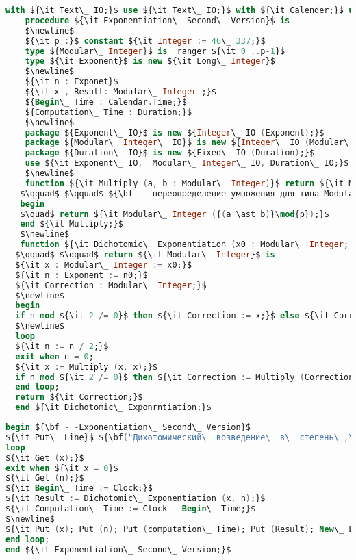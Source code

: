 \begin{lstlisting}[mathescape=true, language=Ada, basicstyle=\small, frame=lrt]
    with ${\it Text\_ IO;}$ use ${\it Text\_ IO;}$ with ${\it Calender;}$ use ${\it Calender;}$
    procedure ${\it Exponentiation\_ Second\_ Version}$ is
    $\newline$
    ${\it p :}$ constant ${\it Integer := 46\_ 337;}$
    type ${Modular\_ Integer}$ is  ranger ${\it 0 ..p-1}$ 
    type ${\it Exponent}$ is new ${\it Long\_ Integer}$
    $\newline$
    ${\it n : Exponet}$
    ${\it x , Result: Modular\_ Integer ;}$
    ${Begin\_ Time : Calendar.Time;}$
    ${Computation\_ Time : Duration;}$
    $\newline$
    package ${Exponent\_ IO}$ is new ${Integer\_ IO (Exponent);}$
    package ${Modular\_ Integer\_ IO}$ is new ${Integer\_ IO (Modular\_ Integer);}$
    package ${Duration\_ IO}$ is new ${Fixed\_ IO (Duration);}$
    use ${\it Exponent\_ IO,  Modular\_ Integer\_ IO, Duration\_ IO;}$
    $\newline$
    function ${\it Multiply (a, b : Modular\_ Integer)}$ return ${\it Modular\_ Integer}$ is
   $\qquad$ $\qquad$ ${\bf - -переопределение умножения для типа Modular\_ Integer}$
   begin
   $\quad$ return ${\it Modular\_ Integer ({(a \ast b)}\mod{p});}$
   end ${\it Multiply;}$
   $\newline$
   function ${\it Dichotomic\_ Exponentiation (x0 : Modular\_ Integer; n0 : Exponent)}$ 
  $\qquad$ $\qquad$ return ${\it Modular\_ Integer}$ is
  ${\it x : Modular\_ Integer := x0;}$
  ${\it n : Exponent := n0;}$
  ${\it Correction : Modular\_ Integer;}$
  $\newline$
  begin
  if n mod ${\it 2 /= 0}$ then ${\it Correction := x;}$ else ${\it Correction := 1;}$ end if;
  $\newline$
  loop
  ${\it n := n / 2;}$
  exit when n = 0;
  ${\it x := Multiply (x, x);}$
  if n mod ${\it 2 /= 0}$ then ${\it Correction := Multiply (Correction, x);}$ end if;
  end loop;
  return ${\it Correction;}$
  end ${\it Dichotomic\_ Exponrntiation;}$
   \end{lstlisting}
\newpage
\begin{lstlisting}[mathescape=true, language=Ada, basicstyle=\small, frame=lrb]
begin ${\bf - -Exponentiation\_ Second\_ Version}$
${\it Put\_ Line}$ ${\bf("Дихотомический\_ возведение\_ в\_ степень\_,\_ вторая\_ версия");}$
loop
${\it Get (x);}$
exit when ${\it x = 0}$
${\it Get (n);}$
${\it Begin\_ Time := Clock;}$
${\it Result := Dichotomic\_ Exponentiation (x, n);}$
${\it Computation\_ Time := Clock - Begin\_ Time;}$
$\newline$
${\it Put (x); Put (n); Put (computation\_ Time); Put (Result); New\_ Line;}$
end loop;
end ${\it Exponentiation\_ Second\_ Version;}$
\end{lstlisting}
